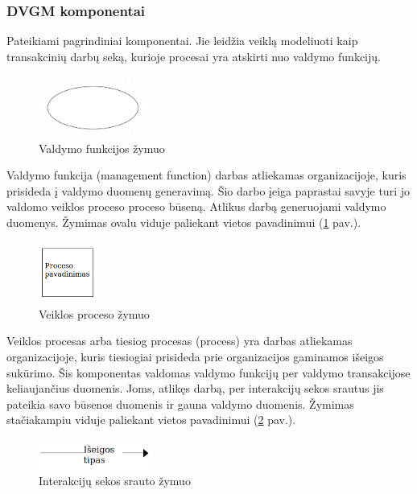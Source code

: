 \subsubsection{DVGM komponentai}

Pateikiami pagrindiniai \DVCM{} komponentai. Jie leidžia veiklą modeliuoti kaip transakcinių darbų seką, kurioje procesai yra atskirti nuo valdymo funkcijų.

\begin{figure}[H]
	\centering
	\includegraphics[height=2cm]{img/dvcm_components/management_function}
	\caption{Valdymo funkcijos žymuo}
	\label{img:dvcm_components_management_function}
\end{figure}

Valdymo funkcija (management function) darbas atliekamas organizacijoje, kuris prisideda į valdymo duomenų generavimą. Šio darbo įeiga paprastai savyje turi jo valdomo veiklos proceso proceso būseną. Atlikus darbą generuojami valdymo duomenys. Žymimas ovalu viduje paliekant vietos pavadinimui (\ref{img:dvcm_components_management_function} pav.).

\begin{figure}[H]
	\centering
	\includegraphics[height=2cm]{img/dvcm_components/process}
	\caption{Veiklos proceso žymuo}
	\label{img:dvcm_components_process}
\end{figure}

Veiklos procesas arba tiesiog procesas (process) yra darbas atliekamas organizacijoje, kuris tiesiogiai prisideda prie organizacijos gaminamos išeigos
sukūrimo. Šis komponentas valdomas valdymo funkcijų per valdymo transakcijose keliaujančius duomenis. Joms, atlikęs darbą, per interakcijų sekos srautus jis pateikia savo būsenos duomenis ir gauna valdymo duomenis. Žymimas stačiakampiu viduje paliekant vietos pavadinimui (\ref{img:dvcm_components_process} pav.).

\begin{figure}[H]
	\centering
	\includegraphics[height=1cm]{img/dvcm_components/sequence_flow}
	\caption{Interakcijų sekos srauto žymuo}
	\label{img:dvcm_components_sequence_flow}
\end{figure}

